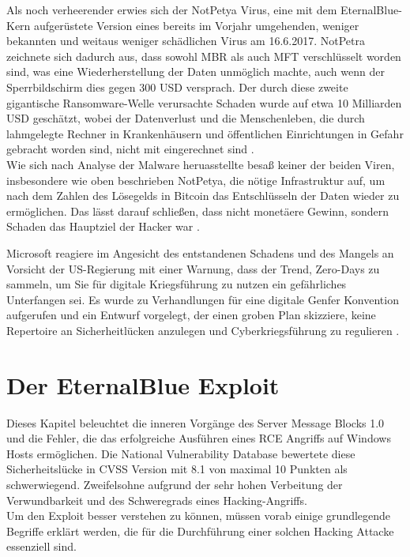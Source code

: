 \documentclass[DIV=12,headings=normal,pdftex,headinclude=false,footinclude=false,final]{scrreprt}
\begin{document}
\noindent
Als noch verheerender erwies sich der NotPetya Virus, eine mit dem EternalBlue-Kern aufgerüstete Version eines bereits im Vorjahr umgehenden, weniger bekannten und weitaus weniger schädlichen Virus am 16.6.2017. NotPetra zeichnete sich dadurch aus, dass sowohl MBR als auch MFT verschlüsselt worden sind, was eine Wiederherstellung der Daten unmöglich machte, auch wenn der Sperrbildschirm dies gegen 300 USD versprach. Der durch diese zweite gigantische Ransomware-Welle verursachte Schaden wurde auf etwa 10 Milliarden USD geschätzt, wobei der Datenverlust und die Menschenleben, die durch lahmgelegte Rechner in Krankenhäusern und öffentlichen Einrichtungen in Gefahr gebracht worden sind, nicht mit eingerechnet sind \cite{Avast}.\\
Wie sich nach Analyse der Malware heruasstellte besaß keiner der beiden Viren, insbesondere wie oben beschrieben NotPetya, die nötige Infrastruktur auf, um nach dem Zahlen des Lösegelds in Bitcoin das Entschlüsseln der Daten wieder zu ermöglichen. Das lässt darauf schließen, dass nicht monetäere Gewinn, sondern Schaden das Hauptziel der Hacker war \cite{Sil}.


\noindent
Microsoft reagiere im Angesicht des entstandenen Schadens und des Mangels an Vorsicht der US-Regierung mit einer Warnung, dass der Trend, Zero-Days zu sammeln, um Sie für digitale Kriegsführung zu nutzen ein gefährliches Unterfangen sei. Es wurde zu Verhandlungen für eine digitale Genfer Konvention aufgerufen und ein Entwurf vorgelegt, der einen groben Plan skizziere, keine Repertoire an Sicherheitlücken anzulegen und Cyberkriegsführung zu regulieren \cite{MS:EB}.

\chapter{Der EternalBlue Exploit}
Dieses Kapitel beleuchtet die inneren Vorgänge des Server Message Blocks 1.0 und die Fehler, die das erfolgreiche Ausführen eines RCE Angriffs auf Windows Hosts ermöglichen. Die National Vulnerability Database bewertete diese Sicherheitslücke in CVSS Version mit 8.1 von maximal 10 Punkten \cite{NVD} als schwerwiegend. Zweifelsohne aufgrund der sehr hohen Verbeitung der Verwundbarkeit und des Schweregrads eines Hacking-Angriffs. \\
Um den Exploit besser verstehen zu können, müssen vorab einige grundlegende Begriffe erklärt werden, die für die Durchführung einer solchen Hacking Attacke essenziell sind.
\end{document}
